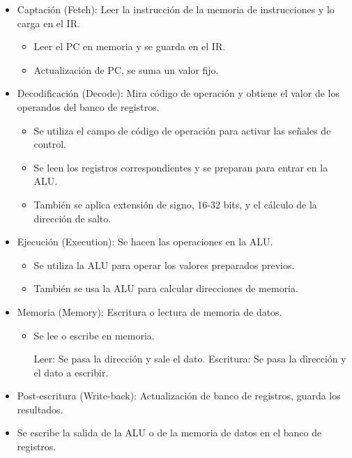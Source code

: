 \documentclass[12pt, twoside, openright]{report} %
\begin{document}
\begin{itemize}
\begin{itemize}
		      \item Captación (Fetch): Leer la instrucción de la memoria de
		            instrucciones y lo carga en el IR.

		            \begin{itemize}

			            \item Leer el PC en memoria y se guarda en el IR.
			            \item Actualización de PC, se suma un valor fijo.
		            \end{itemize}
		      \item Decodificación (Decode): Mira código de operación y obtiene el
		            valor de los operandos del banco de registros.

		            \begin{itemize}

			            \item Se utiliza el campo de código de operación para activar las
			                  señales de control.
			            \item Se leen los registros correspondientes y se preparan para entrar
			                  en la ALU.
			            \item También se aplica extensión de signo, 16-32 bits, y el cálculo
			                  de la dirección de salto.
		            \end{itemize}
		      \item Ejecución (Execution): Se hacen las operaciones en la ALU.

		            \begin{itemize}

			            \item Se utiliza la ALU para operar los valores preparados previos.
			            \item También se usa la ALU para calcular direcciones de memoria.
		            \end{itemize}
		      \item Memoria (Memory): Escritura o lectura de memoria de datos.

		            \begin{itemize}

			            \item Se lee o escribe en memoria.


			                  Leer: Se pasa la dirección y sale el dato.
			                  Escritura: Se pasa la dirección y el dato a escribir.
		            \end{itemize}
		      \item Post-escritura (Write-back): Actualización de banco de registros,
		            guarda los resultados.
		      \item Se escribe la salida de la ALU o de la memoria de datos en el
		            banco de registros.
	      \end{itemize}
\end{itemize}
\end{document}
